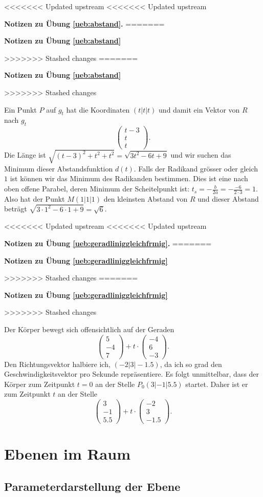 \documentclass[%
11pt,%
twoside,%
titlepage,%
<<<<<<< Updated upstream
<<<<<<< Updated upstream
german,%
=======
swissgerman,%
>>>>>>> Stashed changes
=======
swissgerman,%
>>>>>>> Stashed changes
headsepline%
]{scrartcl}
\newcommand{\faReturnGray}{\textcolor{gray}{\faMailReply}} %
\newcommand{\faReturnGray}{\textcolor{gray}{\faMailReply}} %
\theoremstyle{definition}
\theoremstyle{plain}
\newcommand{\concatueb}[1]{ueb:#1}%
\newcommand{\concatlsg}[1]{lsg:#1}%
\newenvironment{lsg}[1]{%
<<<<<<< Updated upstream
<<<<<<< Updated upstream
    \par\noindent\textbf{Notizen zu Übung \ref{\concatueb{#1}}.}%
    \label{\concatlsg{#1}}
=======
    \par\noindent\textbf{Notizen zu Übung \ref{\concatueb{#1}}}\label{\concatlsg{#1}}
    \hfill\hyperref[\concatueb{#1}]{\faReturnGray}\par %
>>>>>>> Stashed changes
=======
    \par\noindent\textbf{Notizen zu Übung \ref{\concatueb{#1}}}\label{\concatlsg{#1}}
    \hfill\hyperref[\concatueb{#1}]{\faReturnGray}\par %
>>>>>>> Stashed changes
}{%
    \par%
}
\begin{document}
\begin{lsg}{abstand}
Ein Punkt $P$ auf $g_t$ hat die Koordinaten $(t|t|t)$ und damit ein Vektor von $R$ nach $g_t$
$$\begin{pmatrix}
    t-3\\t\\t
\end{pmatrix}.
$$
Die Länge ist $\sqrt{(t-3)^2+t^2+t^2}=\sqrt{3t^2-6t+9}$ und wir suchen das Minimum dieser Abstandsfunktion $d(t)$. Falls der Radikand grösser oder gleich $1$ ist können wir das Minimum des Radikanden bestimmen. Dies ist eine nach oben offene Parabel, deren Minimum der Scheitelpunkt ist: $t_s=-\frac{b}{2a}=-\frac{-6}{2\cdot 3}=1$. Also hat der Punkt $M(1|1|1)$ den kleinsten Abstand von $R$ und dieser Abstand beträgt $\sqrt{3\cdot1^2-6\cdot1+9}=\sqrt{6}$.
\end{lsg}
\begin{lsg}{geradliniggleichfrmig}
Der Körper bewegt sich offensichtlich auf der Geraden
$$\begin{pmatrix}
    5\\-4\\7
\end{pmatrix}+t\cdot\begin{pmatrix}
    -4\\6\\-3
\end{pmatrix}.$$
Den Richtungsvektor halbiere ich, $(-2|3|-1.5)$, da ich so grad den Geschwindigkeitsvektor pro Sekunde repräsentiere. Es folgt unmittelbar, dass der Körper zum Zeitpunkt $t=0$ an der Stelle $P_0(3|-1|5.5)$ startet. Daher ist er zum Zeitpunkt $t$ an der Stelle
$$\begin{pmatrix}
    3\\-1\\5.5
\end{pmatrix}+t\cdot\begin{pmatrix}
    -2\\3\\-1.5
\end{pmatrix}.$$
\end{lsg}

\clearpage

\section{Ebenen im Raum}

\subsection{Parameterdarstellung der Ebene}
\end{document}
